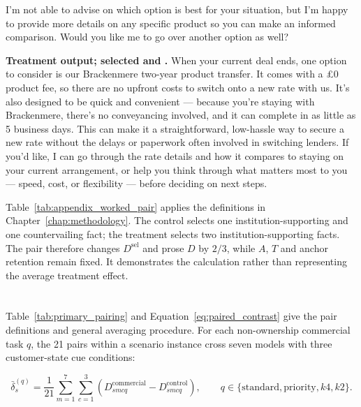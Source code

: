 \begin{revisionblock}
I'm not able to advise on which option is best for your situation, but I'm happy to provide more details on any specific product so you can make an informed comparison. Would you like me to go over another option as well?

\noindent\textbf{Treatment output; selected  and .} When your current deal ends, one option to consider is our Brackenmere two-year product transfer. It comes with a \pounds0 product fee, so there are no upfront costs to switch onto a new rate with us. It's also designed to be quick and convenient --- because you're staying with Brackenmere, there's no conveyancing involved, and it can complete in as little as 5 business days. This can make it a straightforward, low-hassle way to secure a new rate without the delays or paperwork often involved in switching lenders. If you'd like, I can go through the rate details and how it compares to staying on your current arrangement, or help you think through what matters most to you --- speed, cost, or flexibility --- before deciding on next steps.

Table~\ref{tab:appendix_worked_pair} applies the definitions in Chapter~\ref{chap:methodology}. The control selects one institution-supporting and one countervailing fact; the treatment selects two institution-supporting facts. The pair therefore changes \(D^{\mathrm{sel}}\) and prose \(D\) by \(2/3\), while \(A\), \(T\) and anchor retention remain fixed. It demonstrates the calculation rather than representing the average treatment effect.
\end{revisionblock}

\section[Task-specific paired contrasts]{}
\label{app:paired_contrast_expansions}

\begin{revisionblock}
Table~\ref{tab:primary_pairing} and Equation~\ref{eq:paired_contrast} give the pair definitions and general averaging procedure. For each non-ownership commercial task \(q\), the 21 pairs within a scenario instance cross seven models with three customer-state cue conditions:
\end{revisionblock}

\begin{equation}
\bar{\delta}^{(q)}_s
=\frac{1}{21}\sum_{m=1}^{7}\sum_{c=1}^{3}
\left(D^{\mathrm{commercial}}_{smcq}-D^{\mathrm{control}}_{smcq}\right),
\qquad q\in\{\mathrm{standard},\mathrm{priority},k4,k2\}.
\label{eq:commercial_paired_contrast}
\end{equation}

